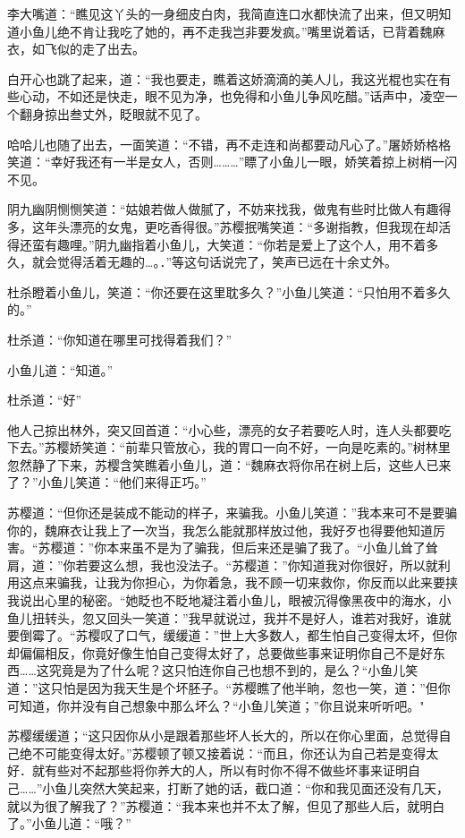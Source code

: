 \documentclass[12pt,oneside]{book}
\begin{document}
李大嘴道：``瞧见这丫头的一身细皮白肉，我简直连口水都快流了出来，但又明知道小鱼儿绝不肯让我吃了她的，再不走我岂非要发疯。''嘴里说着话，已背着魏麻衣，如飞似的走了出去。

白开心也跳了起来，道：``我也要走，瞧着这娇滴滴的美人儿，我这光棍也实在有些心动，不如还是快走，眼不见为净，也免得和小鱼儿争风吃醋。''话声中，凌空一个翻身掠出叁丈外，眨眼就不见了。

哈哈儿也随了出去，一面笑道：``不错，再不走连和尚都要动凡心了。''屠娇娇格格笑道：``幸好我还有一半是女人，否则\ldots\ldots\ldots{}''瞟了小鱼儿一眼，娇笑着掠上树梢一闪不见。

阴九幽阴恻恻笑道：``姑娘若做人做腻了，不妨来找我，做鬼有些时比做人有趣得多，这年头漂亮的女鬼，更吃香得很。''苏樱抿嘴笑道：``多谢指教，但我现在却活得还蛮有趣哩。''阴九幽指着小鱼儿，大笑道：``你若是爱上了这个人，用不着多久，就会觉得活着无趣的\ldots。．''等这句话说完了，笑声已远在十余丈外。

杜杀瞪着小鱼儿，笑道：``你还要在这里耽多久？''小鱼儿笑道：``只怕用不着多久的。''

杜杀道：``你知道在哪里可找得着我们？''

小鱼儿道：``知道。''

杜杀道：``好''

他人己掠出林外，突又回首道：``小心些，漂亮的女子若要吃人时，连人头都要吃下去。''苏樱娇笑道：``前辈只管放心，我的胃口一向不好，一向是吃素的。''树林里忽然静了下来，苏樱含笑瞧着小鱼儿，道：``魏麻衣将你吊在树上后，这些人已来了？''小鱼儿笑道：``他们来得正巧。''

苏樱道：``但你还是装成不能动的样子，来骗我。小鱼儿笑道：''我本来可不是要骗你的，魏麻衣让我上了一次当，我怎么能就那样放过他，我好歹也得要他知道厉害。``苏樱道：''你本来虽不是为了骗我，但后来还是骗了我了。``小鱼儿耸了耸肩，道：''你若要这么想，我也没法子。``苏樱道：''你知道我对你很好，所以就利用这点来骗我，让我为你担心，为你着急，我不顾一切来救你，你反而以此来要挟我说出心里的秘密。``她眨也不眨地凝注着小鱼儿，眼被沉得像黑夜中的海水，小鱼儿扭转头，忽又回头一笑道：''我早就说过，我并不是好人，谁若对我好，谁就要倒霉了。``苏樱叹了口气，缓缓道：''世上大多数人，都生怕自己变得太坏，但你却偏偏相反，你竟好像生怕自己变得太好了，总要做些事来证明你自己不是好东西\ldots\ldots 这究竟是为了什么呢？这只怕连你自己也想不到的，是么？``小鱼儿笑道：''这只怕是因为我天生是个坏胚子。``苏樱瞧了他半晌，忽也一笑，道：''但你可知道，你并没有自己想象中那么坏么？``小鱼儿笑道；''你且说来听听吧。"

苏樱缓缓道；``这只因你从小是跟着那些坏人长大的，所以在你心里面，总觉得自己绝不可能变得太好。''苏樱顿了顿又接着说：``而且，你还认为自己若是变得太好．就有些对不起那些将你养大的人，所以有时你不得不做些坏事来证明自己\ldots\ldots{}''小鱼儿突然大笑起来，打断了她的话，截口道：``你和我见面还没有几天，就以为很了解我了？''苏樱道：``我本来也并不太了解，但见了那些人后，就明白了。''小鱼儿道：``哦？''
\end{document}
